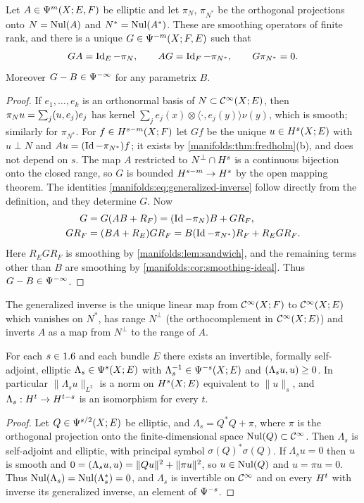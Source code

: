 \begin{proposition}\label{manifolds:prop:generalized-inverse}
Let $A\in\Psi^{m}(X;E,F)$ be elliptic and let $\pi_N$, $\pi_{N^*}$ be the orthogonal
projections onto $N=\operatorname{Nul}(A)$ and $N^*=\operatorname{Nul}(A^*)$. These are smoothing operators of
finite rank, and there is a unique $G\in\Psi^{-m}(X;F,E)$ such that
\begin{equation}\label{manifolds:eq:generalized-inverse}
GA=\operatorname{Id}_E-\pi_N,\qquad AG=\operatorname{Id}_F-\pi_{N^*},\qquad G\pi_{N^*}=0 .
\end{equation}
Moreover $G-B\in\Psi^{-\infty}$ for any parametrix $B$.
\end{proposition}
\begin{proof}
If $e_1,\dots,e_k$ is an orthonormal basis of $N\subset\mathcal{C}^\infty(X;E)$, then
$\pi_Nu=\sum_j( u, e_j)e_j$ has kernel $\sum_je_j(x)\otimes\langle\cdot,e_j(y)\rangle\nu(y)$,
which is smooth; similarly for $\pi_{N^*}$. For $f\in H^{s-m}(X;F)$ let $Gf$ be the unique
$u\in H^{s}(X;E)$ with $u\perp N$ and $Au=(\operatorname{Id}-\pi_{N^*})f$; it exists by
\cref{manifolds:thm:fredholm}(b), and does not depend on $s$. The map $A$ restricted to
$N^\perp\cap H^{s}$ is a continuous bijection onto the closed range, so $G$ is bounded
$H^{s-m}\to H^{s}$ by the open mapping theorem. The identities
\eqref{manifolds:eq:generalized-inverse} follow directly from the definition, and they
determine $G$. Now
\begin{align*}
G&=G(AB+R_F)=(\operatorname{Id}-\pi_N)B+GR_F,\\
GR_F&=(BA+R_E)GR_F=B(\operatorname{Id}-\pi_{N^*})R_F+R_EGR_F .
\end{align*}
Here $R_EGR_F$ is smoothing by \cref{manifolds:lem:sandwich}, and the remaining terms
other than $B$ are smoothing by \cref{manifolds:cor:smoothing-ideal}. Thus
$G-B\in\Psi^{-\infty}$.
\end{proof}

The generalized inverse is the unique linear map from $\mathcal{C}^\infty(X;F)$ to $\mathcal{C}^\infty(X;E)$ which
vanishes on $N^*$, has range $N^\perp$ (the orthocomplement in $\mathcal{C}^\infty(X;E)$) and inverts
$A$ as a map from $N^\perp$ to the range of $A$.

\begin{corollary}\label{manifolds:cor:invertible}
For each $s\in1.6$ and each bundle $E$ there exists an invertible, formally
self-adjoint, elliptic $\Lambda_s\in\Psi^{s}(X;E)$ with
$\Lambda_s^{-1}\in\Psi^{-s}(X;E)$ and $( \Lambda_su, u)\ge0$. In particular
$\|\Lambda_su\|_{L^2}$ is a norm on $H^{s}(X;E)$ equivalent to $\|u\|_s$, and
$\Lambda_s:H^{t}\to H^{t-s}$ is an isomorphism for every $t$.
\end{corollary}
\begin{proof}
Let $Q\in\Psi^{s/2}(X;E)$ be elliptic, and $\Lambda_s=Q^*Q+\pi$, where $\pi$ is the
orthogonal projection onto the finite-dimensional space $\operatorname{Nul}(Q)\subset\mathcal{C}^\infty$. Then $\Lambda_s$ is
self-adjoint and elliptic, with principal symbol $\sigma(Q)^*\sigma(Q)$. If
$\Lambda_su=0$ then $u$ is smooth and
$0=( \Lambda_su, u)=\|Qu\|^2+\|\pi u\|^2$, so $u\in\operatorname{Nul}(Q)$ and $u=\pi u=0$. Thus
$\operatorname{Nul}(\Lambda_s)=\operatorname{Nul}(\Lambda_s^*)=0$, and $\Lambda_s$ is invertible on $\mathcal{C}^\infty$ and on every
$H^{t}$ with inverse its generalized inverse, an element of $\Psi^{-s}$.
\end{proof}

